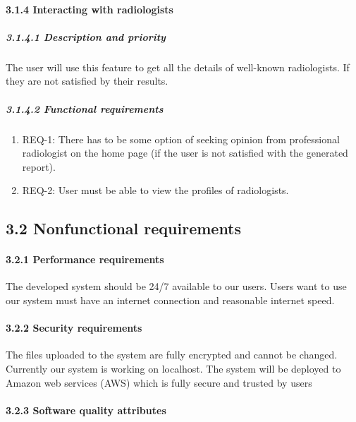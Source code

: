 \documentclass{article} %
\begin{document}
\noindent 
\paragraph{3.1.4  Interacting with radiologists}

\noindent 
\subparagraph{3.1.4.1 Description and priority}

\noindent The user will use this feature to get all the details of well-known radiologists. If they are not satisfied by their results.

\noindent 
\subparagraph{3.1.4.2 Functional requirements}

\begin{enumerate}
\item \textbf{ }REQ-1: There has to be some option of seeking opinion from professional radiologist on the home page (if the user is not satisfied with the generated report).

\item  REQ-2: User must be able to view the profiles of radiologists.
\end{enumerate}

\noindent 
\subsection{3.2 Nonfunctional requirements}

\noindent 
\paragraph{3.2.1 Performance requirements}

\noindent The developed system should be 24/7 available to our users. Users want to use our system must have an internet connection and reasonable internet speed. 

\noindent 
\paragraph{3.2.2 Security requirements}

\noindent The files uploaded to the system are fully encrypted and cannot be changed. Currently our system is working on localhost. The system will be deployed to Amazon web services (AWS) which is fully secure and trusted by users

\noindent 
\paragraph{3.2.3 Software quality attributes}
\end{document}
